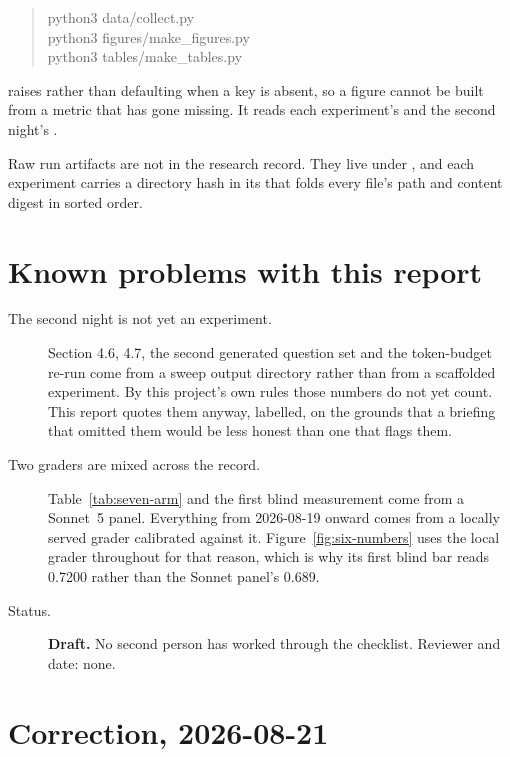 \begin{quote}\small\ttfamily
python3 data/collect.py \\
python3 figures/make\_figures.py \\
python3 tables/make\_tables.py
\end{quote}

 raises rather than defaulting when a key is absent,
so a figure cannot be built from a metric that has gone missing. It reads each
experiment's  and the second night's
.

Raw run artifacts are not in the research record. They live under
, and each experiment carries a directory hash in its
 that folds every file's path and content digest in
sorted order.

\section{Known problems with this report}

\begin{description}
  \item[The second night is not yet an experiment.] Section 4.6, 4.7, the second
    generated question set and the token-budget re-run come from a sweep output
    directory rather than from a scaffolded experiment. By this project's own
    rules those numbers do not yet count. This report quotes them anyway,
    labelled, on the grounds that a briefing that omitted them would be less
    honest than one that flags them.
  \item[Two graders are mixed across the record.] Table~\ref{tab:seven-arm} and
    the first blind measurement come from a Sonnet~5 panel. Everything from
    2026-08-19 onward comes from a locally served grader calibrated against it.
    Figure~\ref{fig:six-numbers} uses the local grader throughout for that
    reason, which is why its first blind bar reads 0.7200 rather than the
    Sonnet panel's 0.689.
  \item[Status.] \textbf{Draft.} No second person has worked through the
    checklist. Reviewer and date: none.
\end{description}

\section{Correction, 2026-08-21}

